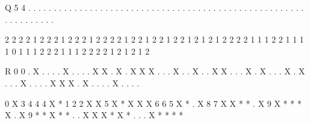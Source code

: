 \begin{datain}
Q 5 4
. . . . . . . .
. . . . . . . .
. . . . . . . .
. . . . . . . .
. . . . . . . .
. . . . . . . .
. . . . . . . .
. . . . . . . .
\end{datain}
\begin{dataout}
2 2 2 2 1 2 2 2
1 2 2 2 1 2 2 2
2 1 2 2 1 2 2 1
2 2 1 2 1 2 1 2
2 2 2 1 1 1 2 2
1 1 1 1 0 1 1 1
2 2 2 1 1 1 2 2
2 2 1 2 1 2 1 2
\end{dataout}
\begin{datain}
R 0 0
. X . . . . X .
. . . X X . X .
X X X . . . X .
. X . . X X . .
. X . X . . . X
. X . . . X . .
. . X X X . X .
. . . X . . . .
\end{datain}
\begin{dataout}
0 X 3 4 4 4 X *
1 2 2 X X 5 X *
X X X 6 6 5 X *
. X 8 7 X X * *
. X 9 X * * * X
. X 9 * * X * *
. . X X X * X *
. . . X * * * *
\end{dataout}
